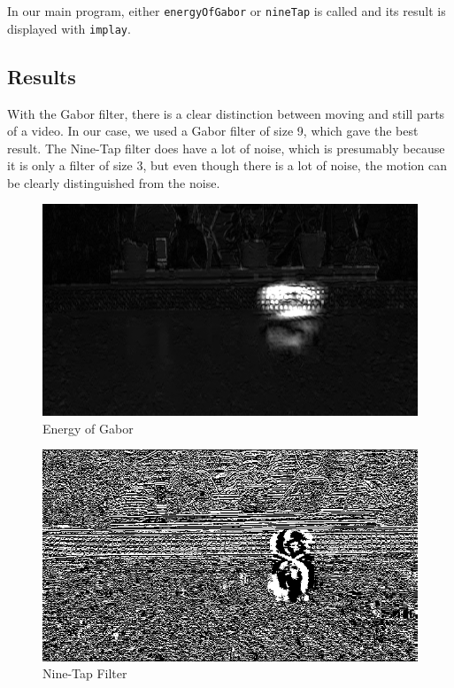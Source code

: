 \documentclass{article}
\begin{document}
  In our main program, either \texttt{energyOfGabor} or \texttt{nineTap} is called and its result is displayed with \texttt{implay}.

  \subsection{Results}

  With the Gabor filter, there is a clear distinction between moving and still parts of a video. In our case, we used a Gabor filter of size 9, which gave the best result. The Nine-Tap filter does have a lot of noise, which is presumably because it is only a filter of size 3, but even though there is a lot of noise, the motion can be clearly distinguished from the noise.

  \begin{figure}[!ht]
    \caption{Energy of Gabor}
    \centering
    \includegraphics[width=.8\textwidth]{gabor.png}
  \end{figure}

  \begin{figure}[!ht]
    \caption{Nine-Tap Filter}
    \centering
    \includegraphics[width=.8\textwidth]{nine-tap.png}
  \end{figure}
\end{document}
